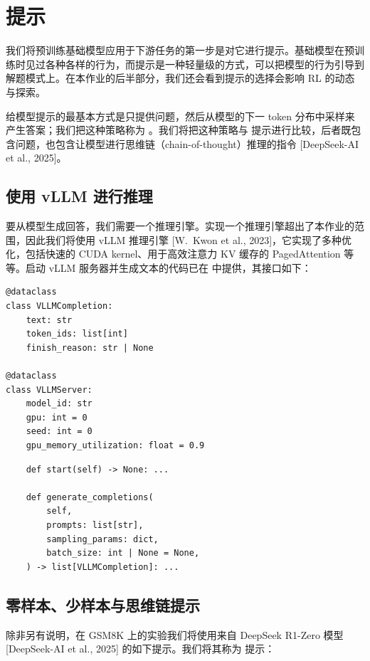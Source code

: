 \section{提示}

我们将预训练基础模型应用于下游任务的第一步是对它进行提示。基础模型在预训练时见过各种各样的行为，而提示是一种轻量级的方式，可以把模型的行为引导到解题模式上。在本作业的后半部分，我们还会看到提示的选择会影响 RL 的动态与探索。

给模型提示的最基本方式是只提供问题，然后从模型的下一 token 分布中采样来产生答案；我们把这种策略称为 。我们将把这种策略与  提示进行比较，后者既包含问题，也包含让模型进行思维链（chain-of-thought）推理的指令 [DeepSeek-AI et al., 2025]。

\subsection{使用 vLLM 进行推理}

要从模型生成回答，我们需要一个推理引擎。实现一个推理引擎超出了本作业的范围，因此我们将使用 vLLM 推理引擎 [W.\ Kwon et al., 2023]，它实现了多种优化，包括快速的 CUDA kernel、用于高效注意力 KV 缓存的 PagedAttention 等等。启动 vLLM 服务器并生成文本的代码已在  中提供，其接口如下：

\begin{lstlisting}
@dataclass
class VLLMCompletion:
    text: str
    token_ids: list[int]
    finish_reason: str | None

@dataclass
class VLLMServer:
    model_id: str
    gpu: int = 0
    seed: int = 0
    gpu_memory_utilization: float = 0.9
\end{lstlisting}

\begin{lstlisting}
    def start(self) -> None: ...

    def generate_completions(
        self,
        prompts: list[str],
        sampling_params: dict,
        batch_size: int | None = None,
    ) -> list[VLLMCompletion]: ...
\end{lstlisting}

\subsection{零样本、少样本与思维链提示}

除非另有说明，在 GSM8K 上的实验我们将使用来自 DeepSeek R1-Zero 模型 [DeepSeek-AI et al., 2025] 的如下提示。我们将其称为  提示：

